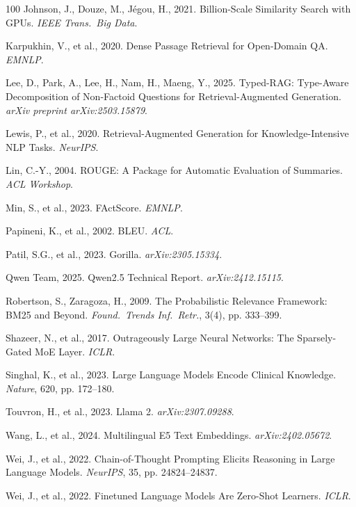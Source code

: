 \documentclass[a4paper,fleql]{cas-sc}
\begin{document}
\begin{thebibliography}{100}
Johnson, J., Douze, M., J\'{e}gou, H., 2021. Billion-Scale Similarity Search with GPUs. \textit{IEEE Trans.\ Big Data}.

Karpukhin, V., et al., 2020. Dense Passage Retrieval for Open-Domain QA. \textit{EMNLP}.

Lee, D., Park, A., Lee, H., Nam, H., Maeng, Y., 2025. Typed-RAG: Type-Aware
Decomposition of Non-Factoid Questions for Retrieval-Augmented Generation.
\textit{arXiv preprint arXiv:2503.15879}.

Lewis, P., et al., 2020. Retrieval-Augmented Generation for Knowledge-Intensive NLP Tasks. \textit{NeurIPS}.

Lin, C.-Y., 2004. ROUGE: A Package for Automatic Evaluation of Summaries. \textit{ACL Workshop}.


Min, S., et al., 2023. FActScore. \textit{EMNLP}.

Papineni, K., et al., 2002. BLEU. \textit{ACL}.

Patil, S.G., et al., 2023. Gorilla. \textit{arXiv:2305.15334}.

Qwen Team, 2025. Qwen2.5 Technical Report. \textit{arXiv:2412.15115}.

Robertson, S., Zaragoza, H., 2009. The Probabilistic Relevance Framework: BM25 and Beyond. \textit{Found.\ Trends Inf.\ Retr.}, 3(4), pp. 333--399.

Shazeer, N., et al., 2017. Outrageously Large Neural Networks: The Sparsely-Gated MoE Layer. \textit{ICLR}.

Singhal, K., et al., 2023. Large Language Models Encode Clinical Knowledge. \textit{Nature}, 620, pp. 172--180.

Touvron, H., et al., 2023. Llama 2. \textit{arXiv:2307.09288}.

Wang, L., et al., 2024. Multilingual E5 Text Embeddings. \textit{arXiv:2402.05672}.

Wei, J., et al., 2022. Chain-of-Thought Prompting Elicits Reasoning in Large Language Models. \textit{NeurIPS}, 35, pp. 24824--24837.

Wei, J., et al., 2022. Finetuned Language Models Are Zero-Shot Learners. \textit{ICLR}.


\end{thebibliography}
\end{document}
